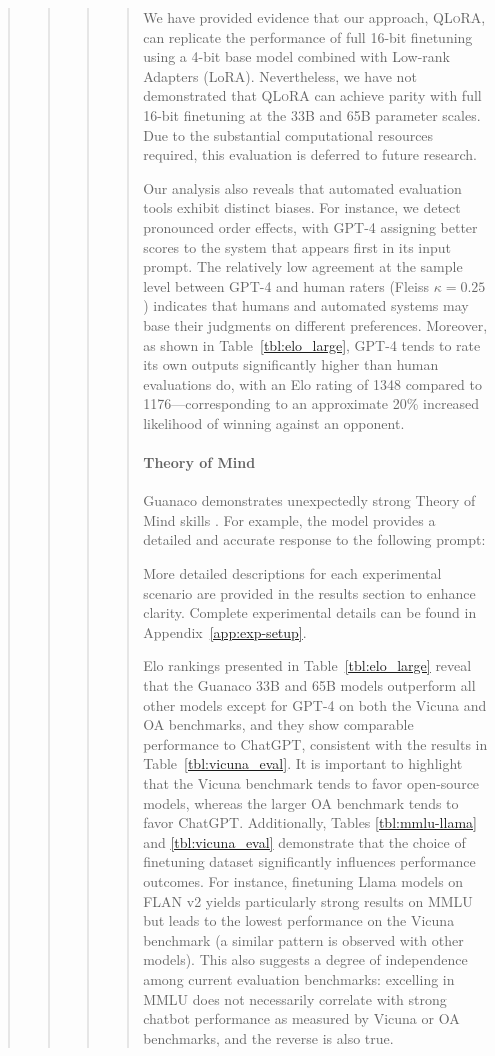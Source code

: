 \begin{quote}
\begin{quote}
\begin{quote}
\begin{quote}
We have provided evidence that our approach, \textsc{QLoRA}, can replicate the performance of full 16-bit finetuning using a 4-bit base model combined with Low-rank Adapters (LoRA). Nevertheless, we have not demonstrated that \textsc{QLoRA} can achieve parity with full 16-bit finetuning at the 33B and 65B parameter scales. Due to the substantial computational resources required, this evaluation is deferred to future research.

Our analysis also reveals that automated evaluation tools exhibit distinct biases. For instance, we detect pronounced order effects, with GPT-4 assigning better scores to the system that appears first in its input prompt. The relatively low agreement at the sample level between GPT-4 and human raters (Fleiss $\kappa=0.25$) indicates that humans and automated systems may base their judgments on different preferences. Moreover, as shown in Table~\ref{tbl:elo_large}, GPT-4 tends to rate its own outputs significantly higher than human evaluations do, with an Elo rating of 1348 compared to 1176—corresponding to an approximate 20\% increased likelihood of winning against an opponent.

\paragraph{Theory of Mind} {Guanaco} demonstrates unexpectedly strong Theory of Mind skills \cite{nematzadeh2018evaluating, sap2022neural}. For example, the model provides a detailed and accurate response to the following prompt:

More detailed descriptions for each experimental scenario are provided in the results section to enhance clarity. Complete experimental details can be found in Appendix~\ref{app:exp-setup}.

Elo rankings presented in Table~\ref{tbl:elo_large} reveal that the {Guanaco} 33B and 65B models outperform all other models except for GPT-4 on both the Vicuna and OA benchmarks, and they show comparable performance to ChatGPT, consistent with the results in Table~\ref{tbl:vicuna_eval}. It is important to highlight that the Vicuna benchmark tends to favor open-source models, whereas the larger OA benchmark tends to favor ChatGPT. Additionally, Tables \ref{tbl:mmlu-llama} and \ref{tbl:vicuna_eval} demonstrate that the choice of finetuning dataset significantly influences performance outcomes. For instance, finetuning Llama models on FLAN v2 yields particularly strong results on MMLU but leads to the lowest performance on the Vicuna benchmark (a similar pattern is observed with other models). This also suggests a degree of independence among current evaluation benchmarks: excelling in MMLU does not necessarily correlate with strong chatbot performance as measured by Vicuna or OA benchmarks, and the reverse is also true.


\end{quote}
\end{quote}
\end{quote}
\end{quote}
